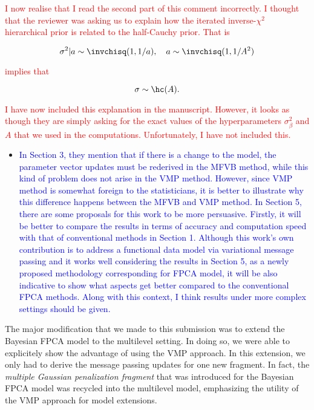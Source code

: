 \documentclass[12pt]{article}
\theoremstyle{plain}
\theoremstyle{definition}
\theoremstyle{remark}
\begin{document}
\vspace{1\baselineskip}

\textcolor{red}{
	I now realise that I read the second part of this comment incorrectly. I thought that the reviewer was
	asking us to explain how the iterated inverse-$\chi^2$ hierarchical prior is related to the half-Cauchy
	prior. That is
}

\textcolor{red}{
	\[
		\sigma^2 | a \sim \invchisq (1, 1/a), \quad a \sim \invchisq(1, 1/A^2)
	\]
}

\noindent \textcolor{red}{
	implies that
}

\noindent \textcolor{red}{
	\[
		\sigma \sim \hc (A).
	\]
}

\noindent \textcolor{red}{
	I have now included this explanation in the manuscript.
	However, it looks as though they are simply asking for the exact values of the hyperparameters
	$\sigma_\beta^2$ and $A$ that we used in the computations. Unfortunately, I have not included
	this.
}

\vspace{2\baselineskip}

\begin{itemize}
	\item[\textcolor{blue}{\textbullet}] \textcolor{blue}{
		In Section 3, they mention that if there is a change to the model, the parameter vector updates must
		be rederived in the MFVB method, while this kind of problem does not arise in the VMP method. However,
		since VMP method is somewhat foreign to the statisticians, it is better to illustrate why this difference
		happens between the MFVB and VMP method. In Section 5, there are some proposals for this work to
		be more persuasive. Firstly, it will be better to compare the results in terms of accuracy and computation
		speed with that of conventional methods in Section 1. Although this work’s own contribution is to address
		a functional data model via variational message passing and it works well considering the results in Section
		5, as a newly proposed methodology corresponding for FPCA model, it will be also indicative to show what
		aspects get better compared to the conventional FPCA methods. Along with this context, I think results under
		more complex settings should be given.
	}
\end{itemize}

\vspace{1\baselineskip}

The major modification that we made to this submission was to extend the Bayesian FPCA model to the multilevel
setting. In doing so, we were able to explicitely show the advantage of using the VMP approach. In this extension,
we only had to derive the message passing updates for one new fragment. In fact, the \emph{multiple Gaussian
penalization fragment} that was
introduced for the Bayesian FPCA model was recycled into the multilevel model, emphasizing the utility of the
VMP approach for model extensions.
\end{document}
